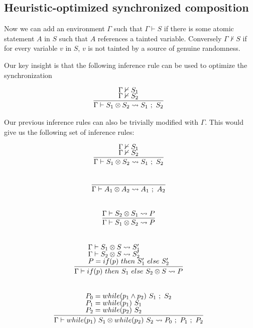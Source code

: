 \documentclass{article}
\newcommand{\cross}{\otimes{}}
\begin{document}
\subsection{Heuristic-optimized synchronized composition}

	Now we can add an environment $\Gamma$ such that $\Gamma \vdash S$ if there is some atomic statement $A$ in $S$ such that $A$ references a tainted variable. Conversely $\Gamma \nvdash S$ if for every variable $v$ in $S$, $v$ is not tainted by a source of genuine randomness. 


	Our key insight is that the following inference rule can be used to optimize the synchronization

	\[
		\begin{array}{c}
			\infer[]{\Gamma \vdash S_1 \cross S_2 \leadsto S_1\ ;\ S_2}{
				\Gamma \nvdash S_1 \\
				\Gamma \nvdash S_2
			} \\
		\end{array}
	\]

	Our previous inference rules can also be trivially modified with $\Gamma$. This would give us the following set of inference rules: 

	\[
		\begin{array}{c}
			\infer[]{\Gamma \vdash S_1 \cross S_2 \leadsto S_1\ ;\ S_2}{
				\Gamma \nvdash S_1 \\
				\Gamma \nvdash S_2
			} \\ \\ \\
			\infer[]{\Gamma \vdash A_1 \cross A_2 \leadsto A_1\ ;\ A_2}{} \\ \\ \\
			\infer[]{\Gamma \vdash S_1 \cross S_2 \leadsto P}{
				\Gamma \vdash S_2 \cross S_1 \leadsto P
			} \\ \\ \\
			\infer[]{\Gamma \vdash if(p)\ then\ S_1\ else\ S_2 \cross S \leadsto P}{
				\text{$\Gamma \vdash S_1 \cross S \leadsto S_1'$} \\
				\text{$\Gamma \vdash S_2 \cross S \leadsto S_2'$} \\
				\text{$P = if(p)\ then\ S_1'\ else\ S_2'$}
			} \\ \\ \\
			\infer[]{\Gamma \vdash while(p_1)\ S_1 \cross while(p_2)\ S_2 \leadsto P_0\ ;\ P_1\ ;\ P_2}{
				\text{$P_0 = while(p_1 \land p_2)\ S_1\ ;\ S_2$} \\
				\text{$P_1 = while(p_1)\ S_1$} \\
				\text{$P_2 = while(p_2)\ S_2$}
			}
		\end{array}
	\]
\end{document}
